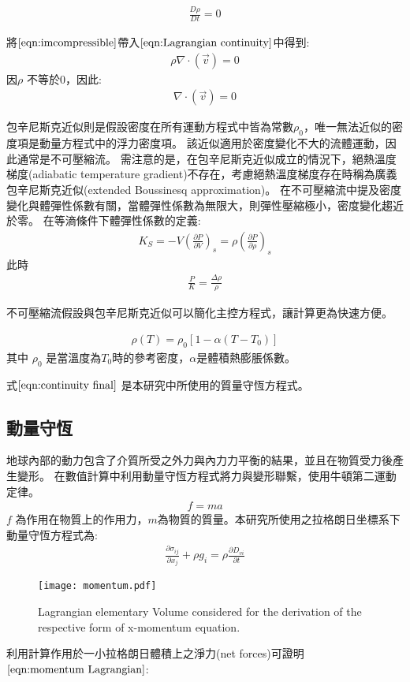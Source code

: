 \begin{align}
\frac{D\rho}{Dt} = 0 \label{eqn:imcompressible}
\end{align}

將$\ref{eqn:imcompressible}$帶入$\ref{eqn:Lagrangian continuity}$中得到:
\begin{align}
\rho \nabla\cdot(\vec v) = 0
\end{align}
因$\rho$ 不等於0，因此:
\begin{align}
\nabla\cdot(\vec v) = 0 \label{eqn:continuity final}
\end{align}


包辛尼斯克近似則是假設密度在所有運動方程式中皆為常數$\rho_0$，唯一無法近似的密度項是動量方程式中的浮力密度項。
該近似適用於密度變化不大的流體運動，因此通常是不可壓縮流。
需注意的是，在包辛尼斯克近似成立的情況下，絕熱溫度梯度(adiabatic temperature gradient)不存在，考慮絕熱溫度梯度存在時稱為廣義包辛尼斯克近似(extended Boussinesq approximation)。
在不可壓縮流中提及密度變化與體彈性係數有關，當體彈性係數為無限大，則彈性壓縮極小，密度變化趨近於零。
在等滳條件下體彈性係數的定義:
\begin{align}
K_S = -V(\frac{\partial P}{\partial V})_s = \rho(\frac{\partial P}{\partial \rho})_s
\end{align}
此時
\begin{align}
\frac{P}{K} = \frac{\Delta \rho}{\rho}
\end{align}


不可壓縮流假設與包辛尼斯克近似可以簡化主控方程式，讓計算更為快速方便。

\begin{align}
\rho (T) = \rho_0[1-\alpha (T-T_0)] 
\end{align}
其中 $\rho_0$ 是當溫度為$T_0$時的參考密度，$\alpha$是體積熱膨脹係數。

式$\ref{eqn:continuity final}$ 是本研究中所使用的質量守恆方程式。

\subsection{動量守恆}


地球內部的動力包含了介質所受之外力與內力力平衡的結果，並且在物質受力後產生變形。
在數值計算中利用動量守恆方程式將力與變形聯繫，使用牛頓第二運動定律。
\begin{align}
f=ma
\end{align}
$f$ 為作用在物質上的作用力，$m$為物質的質量。本研究所使用之拉格朗日坐標系下動量守恆方程式為:
\begin{align}
\frac{\partial \sigma_{ij}}{\partial x_j}+\rho g_i = \rho \frac{\partial D_{vi}}{\partial t}\label{eqn:momentum Lagrangian}
\end{align}
\begin{figure*}[ht!]
    \centering
    \texttt{[image: momentum.pdf]}
    \caption{ Lagrangian elementary Volume considered for the derivation of the respective form of x-momentum equation.}
    \label{fig::Lagrangian Volume Momentum}
\end{figure*}
利用計算作用於一小拉格朗日體積上之淨力(net forces)可證明$\ref{eqn:momentum Lagrangian}$:


